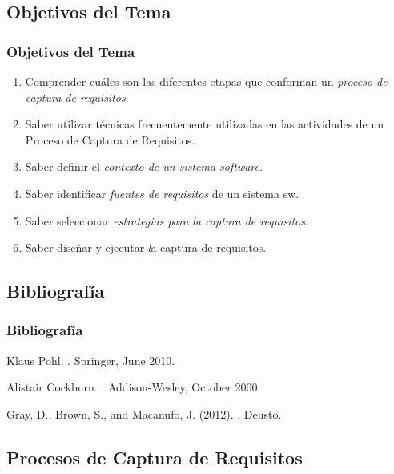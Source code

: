\documentclass[handout,a4paper,slidestop,xcolor=pst,dvips,blue]{beamer}
\begin{document}
\subsection{Objetivos del Tema}

\begin{frame}[c]
    \frametitle{Objetivos del Tema}
    \begin{enumerate}[<+->]
         \item Comprender cuáles son las diferentes etapas que conforman un \emph{proceso de captura de requisitos}.
         \item Saber utilizar técnicas frecuentemente utilizadas en las actividades de un Proceso de Captura de Requisitos.
         \item Saber definir el \emph{contexto de un sistema software}.
         \item Saber identificar \emph{fuentes de requisitos} de un sistema sw.
         \item Saber seleccionar \emph{estrategias para la captura de requisitos}.
         \item Saber diseñar y ejecutar \emph la captura de requisitos.
    \end{enumerate}
\end{frame}

\subsection{Bibliografía}

\begin{frame}[c]
    \frametitle{Bibliografía}
    \begin{thebibliography}{1}

     Klaus Pohl. .
    \newblock Springer, June 2010.

     Alistair Cockburn. .
    \newblock Addison-Wesley, October 2000.

    Gray, D., Brown, S., and Macanufo, J. (2012).
    .
    \newblock Deusto.
\end{thebibliography}
\end{frame}

\subsection{Procesos de Captura de Requisitos}
\end{document}
